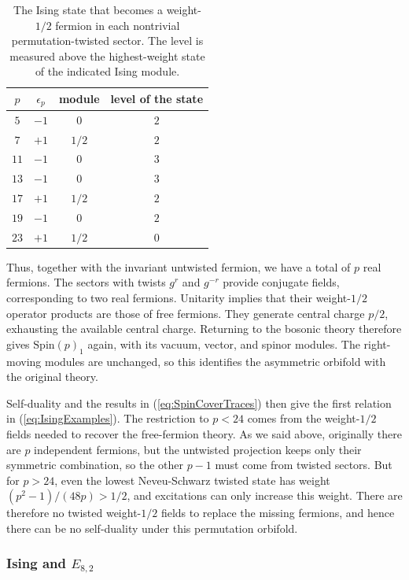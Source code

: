 \documentclass[12pt]{article}
\numberwithin{equation}{section}
\theoremstyle{remark}
\begin{document}
\begin{table}[t]
\centering
\begin{tabular}{c c c c}
\toprule
$p$ & $\epsilon_p$ & module & level of the state\\
\midrule
$5$ & $-1$ & $0$ & $2$\\
$7$ & $+1$ & $1/2$ & $2$\\
$11$ & $-1$ & $0$ & $3$\\
$13$ & $-1$ & $0$ & $3$\\
$17$ & $+1$ & $1/2$ & $2$\\
$19$ & $-1$ & $0$ & $2$\\
$23$ & $+1$ & $1/2$ & $0$\\
\bottomrule
\end{tabular}
\caption{The Ising state that becomes a weight-$1/2$ fermion in each nontrivial permutation-twisted sector. The level is measured above the highest-weight state of the indicated Ising module.}
\label{tabSpinTwistedFermions}
\end{table}

Thus, together with the invariant untwisted fermion, we have a total of $p$ real fermions. The sectors with twists $g^r$ and $g^{-r}$ provide conjugate fields, corresponding to two real fermions. Unitarity implies that their weight-$1/2$ operator products are those of free fermions. They generate central charge $p/2$, exhausting the available central charge. Returning to the bosonic theory therefore gives $\mathrm{Spin}(p)_1$ again, with its vacuum, vector, and spinor modules. The right-moving modules are unchanged, so this identifies the asymmetric orbifold with the original theory.

Self-duality and the results in (\ref{eq:SpinCoverTraces}) then give the first relation in (\ref{eq:IsingExamples}). The restriction to $p<24$ comes from the weight-$1/2$ fields needed to recover the free-fermion theory. As we said above, originally there are $p$ independent fermions, but the untwisted projection keeps only their symmetric combination, so the other $p-1$ must come from twisted sectors. But for $p>24$, even the lowest Neveu-Schwarz twisted state has weight $(p^2-1)/(48p)>1/2$, and excitations can only increase this weight. There are therefore no twisted weight-$1/2$ fields to replace the missing fermions, and hence there can be no self-duality under this permutation orbifold. 


\subsubsection{Ising and $E_{8,2}$}
\label{sec:IsingEeighttwo}
\end{document}
